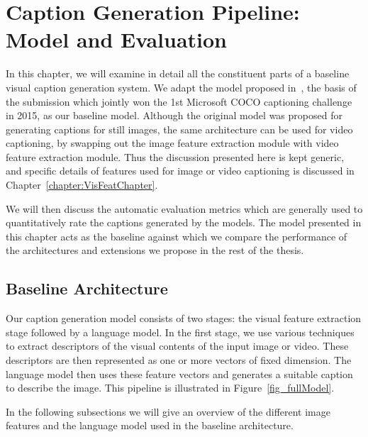 \chapter[Caption Generation Pipeline: Model and Evaluation]{Caption Generation Pipeline: \\Model and Evaluation}
\label{chapter:baseline}
In this chapter, we will examine in detail all the constituent parts
of a baseline visual caption generation system.
We adapt the model proposed in~\cite{Vinyals_2015_CVPR}, the basis of the
submission which jointly won the 1st Microsoft COCO captioning challenge in
2015, as our baseline model.
Although the original model was proposed for generating captions for still
images, the same architecture can be used for video captioning, by
swapping out the image feature extraction module with video feature extraction
module.
Thus the discussion presented here is kept generic, and specific details of
features used for image or video captioning is discussed in
Chapter~\ref{chapter:VisFeatChapter}.

We will then discuss the automatic evaluation metrics which are generally used
to quantitatively rate the captions generated by the models. 
The model presented in this chapter acts as the baseline against which we
compare the performance of the architectures and extensions we propose in the
rest of the thesis.
\section{Baseline Architecture} 

Our caption generation model consists of two stages: the visual
feature extraction stage followed by a language model.
In the first stage, we use various techniques to extract descriptors of
the visual contents of the input image or video.
These descriptors are then represented as one or more vectors of fixed
dimension.
The language model then uses these feature vectors and generates a
suitable caption to describe the image.
This pipeline is illustrated in Figure~\ref{fig_fullModel}. 

In the following subsections we will give an overview of the different image
features and the language model used in the baseline architecture.

